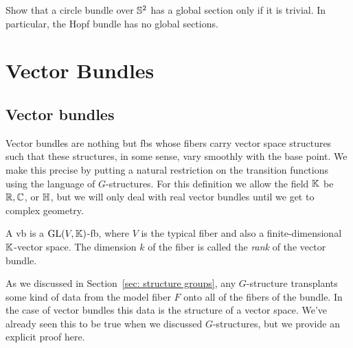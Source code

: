 \begin{xca}
    Show that a circle bundle over $\mathbb{S}^2$ has a global section only if it is trivial. In particular, the Hopf bundle has no global sections.
\end{xca}

\clearpage
\section{Vector Bundles}


\subsection{Vector bundles}

Vector bundles are nothing but \glspl{fb} whose fibers carry vector space structures such that these structures, in some sense, vary smoothly with the base point. We make this precise by putting a natural restriction on the transition functions using the language of $G$-structures. For this definition we allow the field $\mathbb{K}$ be $\mathbb{R},\mathbb{C}$, or $\mathbb{H}$, but we will only deal with real vector bundles until we get to complex geometry.

\begin{defn}
    A \gls{vb} is a $\operatorname{GL}(V,\mathbb{K})$-\gls{fb}, where $V$ is the typical fiber and also a finite-dimensional $\mathbb{K}$-vector space. The dimension $k$ of the fiber is called the \emph{rank} of the vector bundle.
\end{defn}

As we discussed in Section~\ref{sec: structure groups}, any $G$-structure transplants some kind of data from the model fiber $F$ onto all of the fibers of the bundle. In the case of vector bundles this data is the structure of a vector space. We've already seen this to be true when we discussed $G$-structures, but we provide an explicit proof here.

